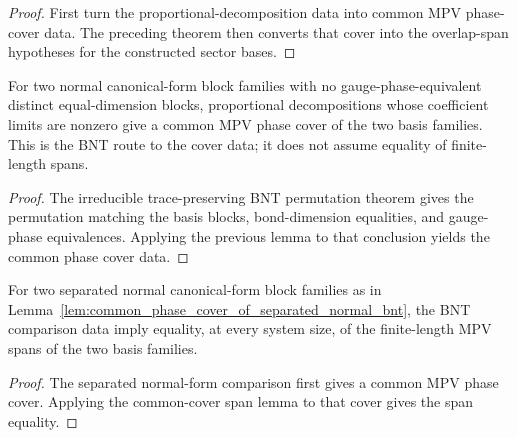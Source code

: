 \begin{proof}
	\leanok
	First turn the proportional-decomposition data into common MPV phase-cover data.
	The preceding theorem then converts that cover into the overlap-span hypotheses
	for the constructed sector bases.
\end{proof}

\begin{lemma}%
\label{lem:common_phase_cover_of_separated_normal_bnt}
	\leanok
	For two normal canonical-form block families with no gauge-phase-equivalent
	distinct equal-dimension blocks, proportional decompositions whose coefficient
	limits are nonzero give a common MPV phase cover of the two basis families.
	This is the BNT route to the cover data; it does not assume equality of
	finite-length spans.
\end{lemma}

\begin{proof}
	\leanok
	The irreducible trace-preserving BNT permutation theorem gives the permutation
	matching the basis blocks, bond-dimension equalities, and gauge-phase
	equivalences. Applying the previous lemma to that conclusion yields the
	common phase cover data.
\end{proof}

\begin{lemma}%
\label{lem:separated_normal_bnt_span_eq}
	\leanok
	For two separated normal canonical-form block families as in
	Lemma~\ref{lem:common_phase_cover_of_separated_normal_bnt}, the BNT
	comparison data imply equality, at every system size, of the finite-length
	MPV spans of the two basis families.
\end{lemma}

\begin{proof}
	\leanok
	The separated normal-form comparison first gives a common MPV phase cover.
	Applying the common-cover span lemma to that cover gives the span equality.
\end{proof}

